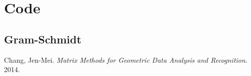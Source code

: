 \appendix

\section{Code}\label{code}

\subsection{Gram-Schmidt} \label{code:gram_schmidt}

%


\begin{thebibliography}{10}
    Chang, Jen-Mei. \textit{Matrix Methods for Geometric Data Analysis and Recognition}. 2014.

\end{thebibliography}


